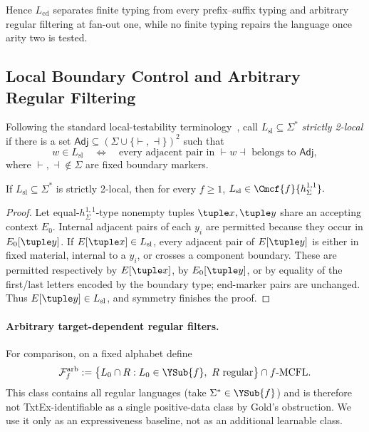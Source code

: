 Hence $L_{\mathrm{cd}}$ separates finite typing from every prefix--suffix
typing and arbitrary regular filtering at fan-out one, while no finite typing
repairs the language once arity two is tested.

\subsection{Local Boundary Control and Arbitrary Regular Filtering}
\label{subsec:comparison-separations}

Following the standard local-testability terminology~\cite{McNaughtonPapert1971}, call
$L_{\mathrm{sl}}\subseteq\Sigma^*$ \emph{strictly 2-local} if there is a set
$\mathsf{Adj}\subseteq(\Sigma\cup\{\vdash,\dashv\})^2$ such that
\[
 w\in L_{\mathrm{sl}}
 \quad\Longleftrightarrow\quad
 \text{every adjacent pair in $\vdash w\dashv$ belongs to $\mathsf{Adj}$},
\]
where $\vdash,\dashv\notin\Sigma$ are fixed boundary markers.

\begin{lemma}
\label{lem:sl2-boundary-control}
If $L_{\mathrm{sl}}\subseteq\Sigma^*$ is strictly 2-local, then for every $f\ge1$,
\(L_{\mathrm{sl}}\in\Cmcf{f}{h_\Sigma^{1,1}}.\)
\end{lemma}

\begin{proof}
Let equal-$h_\Sigma^{1,1}$-type nonempty tuples $\tuple x,\tuple y$ share an
accepting context $E_0$.  Internal adjacent pairs of each $y_i$ are permitted
because they occur in $E_0[\tuple y]$.  If $E[\tuple x]\in L_{\mathrm{sl}}$,
every adjacent pair of $E[\tuple y]$ is either in fixed material, internal to
a $y_i$, or crosses a component boundary.  These are permitted respectively
by $E[\tuple x]$, by $E_0[\tuple y]$, or by equality of the first/last letters
encoded by the boundary type; end-marker pairs are unchanged.  Thus
$E[\tuple y]\in L_{\mathrm{sl}}$, and symmetry finishes the proof.
\end{proof}

\paragraph{Arbitrary target-dependent regular filters.}
For comparison, on a fixed alphabet define
\[
 \mathcal F_f^{\mathrm{arb}}
 :=\bigl\{L_0\cap R:L_0\in\YSub{f},\ R\text{ regular}\bigr\}
   \cap f\text{-}\mathrm{MCFL}.
\]
This class contains all regular languages
(take $\Sigma^*\in\YSub{f}$) and is therefore
not TxtEx-identifiable as a single
positive-data class by Gold's obstruction.
We use it only as an expressiveness baseline,
not as an additional learnable class.

